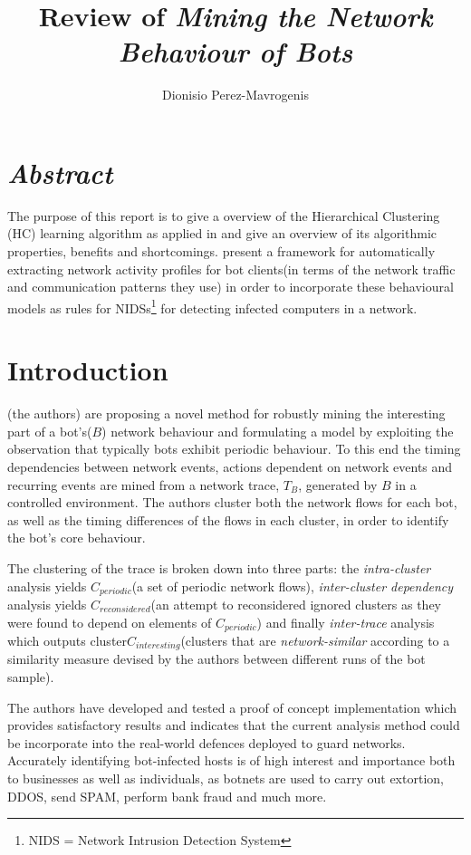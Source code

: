 \documentclass[12pt,a4paper,twocolumn]{article}
\author{Dionisio Perez-Mavrogenis}
\title{Review of \emph{Mining the Network Behaviour of Bots}}
\begin{document}
	\maketitle
	\section*{\emph{Abstract}}
	The purpose of this report is to give a overview of the Hierarchical Clustering (HC) learning algorithm as applied in \citep{cavallaro} and give an overview of its algorithmic properties, benefits and shortcomings.\citeauthor{cavallaro} present a framework for automatically extracting network activity profiles for bot clients(in terms of the network traffic and communication patterns they use) in order to incorporate these behavioural models as rules for NIDSs\footnote{NIDS = Network Intrusion Detection System} for detecting infected computers in a network.
	
	\section{Introduction}
\citet{cavallaro}(the authors) are proposing a novel method for robustly mining the interesting part of a bot's($B$) network behaviour and formulating a model by exploiting the observation that typically bots exhibit periodic behaviour. To this end the timing dependencies between network events, actions dependent on network events and recurring events are mined from a network trace, $T_B$, generated by $B$ in a controlled environment. The authors cluster both the network flows for each bot, as well as the timing differences of the flows in each cluster, in order to identify the bot's core behaviour.

	 The clustering of the trace is broken down into three parts: the \emph{intra-cluster} analysis yields $C_{periodic}$(a set of periodic network flows), \emph{inter-cluster dependency} analysis yields $C_{reconsidered}$(an attempt to reconsidered ignored clusters as they were found to depend on elements of $C_{periodic}$) and finally \emph{inter-trace} analysis which outputs cluster$C_{interesting}$(clusters that are \emph{network-similar} according to a similarity measure devised by the authors between different runs of the bot sample). 
	
	The authors have developed and tested a proof of concept implementation which provides satisfactory results and indicates that the current analysis method could be incorporate into the real-world defences deployed to guard networks. Accurately identifying bot-infected hosts is of high interest and importance both to businesses as well as individuals, as botnets are used to carry out extortion, DDOS, send SPAM, perform bank fraud and much more. 
	
\end{document}
